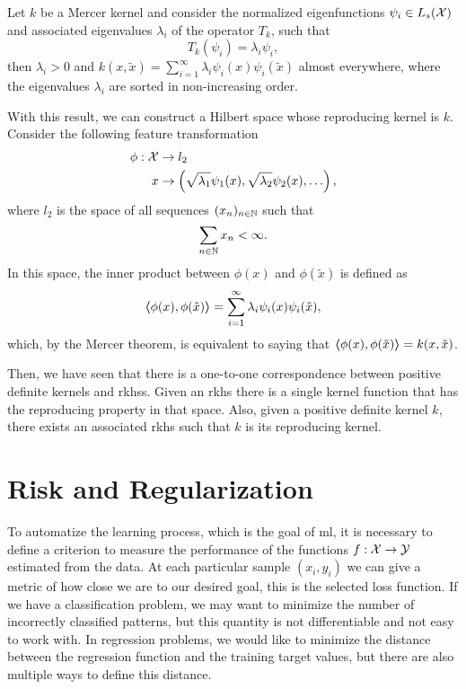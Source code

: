 \begin{theorem}    
Let $k$ be a Mercer kernel and consider the normalized eigenfunctions $\psi_i \in L_s(\mathcal{X})$ and associated eigenvalues $\lambda_i$ of the operator $T_k$, such that
$$ T_k(\psi_i) = \lambda_i \psi_i , $$
then $\lambda_i > 0$ and $k(x, \tilde{x}) = \sum_{i=1}^\infty \lambda_i \psi_i(x) \psi_i(\tilde{x})$ almost everywhere, where the eigenvalues $\lambda_i$ are sorted in non-increasing order. 
\end{theorem}
%
With this result, we can construct a Hilbert space whose reproducing kernel is $k$.
Consider the following feature transformation
\begin{equation}
    \begin{aligned}
        \nonumber
        \phi: \mathcal{X} &\to l_2 \\
        x &\to \left(\sqrt{\lambda_1} \psi_1(x), \sqrt{\lambda_2} \psi_2(x), \ldots \right) ,
    \end{aligned}
\end{equation}
where $l_2$ is the space of all sequences $(x_n)_{n \in \mathbb{N}}$ such that $$ \sum_{n \in \mathbb{N}} x_n < \infty .$$
In this space, the inner product between $\phi(x)$ and $\phi(\tilde{x})$ is defined as
$$ \bm{\left\langle} \phi(x), \phi(\tilde{x}) \bm{\right\rangle} = \sum_{i=1}^\infty \lambda_i \psi_i(x) \psi_i(\tilde{x}),$$ which, by the Mercer theorem, is equivalent to saying that $\bm{\left\langle} \phi(x), \phi(\tilde{x}) \bm{\right\rangle} = k(x, \tilde{x})$.

Then, we have seen that there is a one-to-one correspondence between positive definite kernels and \acrshort{rkhss}. Given an \acrshort{rkhs} there is a single kernel function that has the reproducing property in that space. Also, given a positive definite kernel $k$, there exists an associated \acrshort{rkhs} such that $k$ is its reproducing kernel. 











\section{Risk and Regularization}
To automatize the learning process, which is the goal of \acrshort{ml}, it is necessary to define a criterion to measure the performance of the functions $f: \mathcal{X} \to \mathcal{Y}$ estimated from the data.
At each particular sample $(x_i, y_i)$ we can give a metric of how close we are to our desired goal, this is the selected loss function. If we have a classification problem, we may want to minimize the number of incorrectly classified patterns, but this quantity is not differentiable and not easy to work with. In regression problems, we would like to minimize the distance between the regression function and the training target values, but there are also multiple ways to define this distance. 
%


